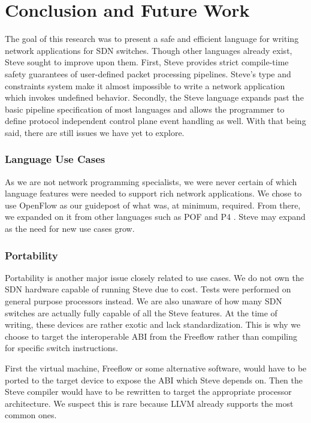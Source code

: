 \chapter{Conclusion and Future Work} \label{ch:conclusion}

The goal of this research was to present a safe and efficient language for writing network applications for SDN switches. Though other languages already exist, Steve sought to improve upon them. First, Steve provides strict compile-time safety guarantees of user-defined packet processing pipelines.
Steve's type and constraints system make it almost impossible to write a network application which invokes undefined behavior.
Secondly, the Steve language expands past the basic pipeline specification of most languages and allows the programmer to define protocol independent control plane event handling as well.
With that being said, there are still issues we have yet to explore.

\subsection{Language Use Cases}

As we are not network programming specialists, we were never certain of which language features were needed to support rich network applications. We chose to use OpenFlow \cite{openflow_spec} as our guidepost of what was, at minimum, required. From there, we expanded on it from other languages such as POF \cite{pof, pof_fis, pof_impl} and P4 \cite{pof, p42014, p4_spec}. Steve may expand as the need for new use cases grow.

\subsection{Portability}

Portability is another major issue closely related to use cases. We do not own the SDN hardware capable of running Steve due to cost. Tests were performed on general purpose processors instead. We are also unaware of how many SDN switches are actually fully capable of all the Steve features. At the time of writing, these devices are rather exotic and lack standardization. This is why we choose to target the interoperable ABI from the Freeflow rather than compiling for specific switch instructions.

First the virtual machine, Freeflow \cite{freeflow_software} or some alternative software, would have to be ported to the target device to expose the ABI which Steve depends on. Then the Steve compiler would have to be rewritten to target the appropriate processor architecture. We suspect this is rare because LLVM already supports the most common ones.

